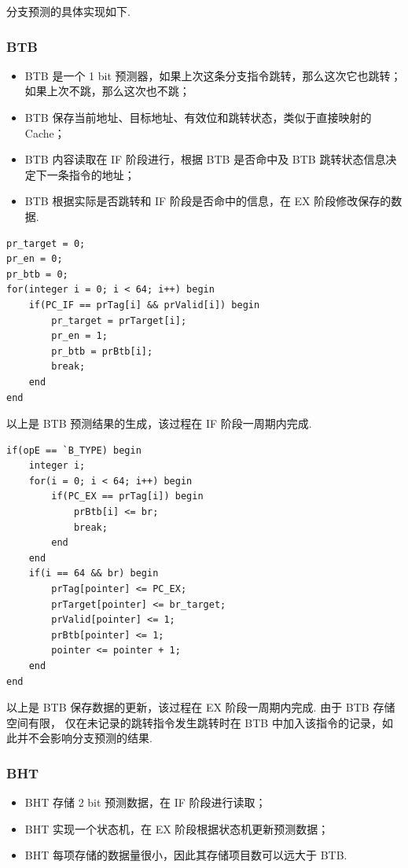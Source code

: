 \documentclass[UTF8]{ctexart}
\begin{document}
分支预测的具体实现如下.

\subsubsection{BTB}

\begin{itemize} 
    \item BTB 是一个 1 bit 预测器，如果上次这条分支指令跳转，那么这次它也跳转；如果上次不跳，那么这次也不跳；
    \item BTB 保存当前地址、目标地址、有效位和跳转状态，类似于直接映射的 Cache；
    \item BTB 内容读取在 IF 阶段进行，根据 BTB 是否命中及 BTB 跳转状态信息决定下一条指令的地址；
    \item BTB 根据实际是否跳转和 IF 阶段是否命中的信息，在 EX 阶段修改保存的数据.
\end{itemize}

\begin{lstlisting}[style=verilog,caption={生成 BTB 预测结果}]
pr_target = 0;
pr_en = 0;
pr_btb = 0;
for(integer i = 0; i < 64; i++) begin
    if(PC_IF == prTag[i] && prValid[i]) begin
        pr_target = prTarget[i];
        pr_en = 1;
        pr_btb = prBtb[i];
        break;
    end
end
\end{lstlisting}

以上是 BTB 预测结果的生成，该过程在 IF 阶段一周期内完成.

\begin{lstlisting}[style=verilog,caption={更新 BTB 保存数据}]
if(opE == `B_TYPE) begin
    integer i;
    for(i = 0; i < 64; i++) begin
        if(PC_EX == prTag[i]) begin
            prBtb[i] <= br;
            break;
        end
    end
    if(i == 64 && br) begin
        prTag[pointer] <= PC_EX;
        prTarget[pointer] <= br_target;
        prValid[pointer] <= 1;
        prBtb[pointer] <= 1;
        pointer <= pointer + 1;
    end
end
\end{lstlisting}

以上是 BTB 保存数据的更新，该过程在 EX 阶段一周期内完成. 由于 BTB 存储空间有限，
仅在未记录的跳转指令发生跳转时在 BTB 中加入该指令的记录，如此并不会影响分支预测的结果.

\subsubsection{BHT}

\begin{itemize} 
    \item BHT 存储 2 bit 预测数据，在 IF 阶段进行读取；
    \item BHT 实现一个状态机，在 EX 阶段根据状态机更新预测数据；
    \item BHT 每项存储的数据量很小，因此其存储项目数可以远大于 BTB.
\end{itemize}
\end{document}
